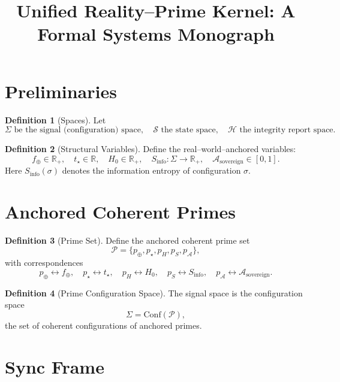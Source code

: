 \documentclass[12pt]{article}
\title{Unified Reality--Prime Kernel: A Formal Systems Monograph}
\author{}
\date{}
\theoremstyle{definition}
\newtheorem{definition}{Definition}[section]
\theoremstyle{plain}
\begin{document}
\maketitle

\tableofcontents

\section{Preliminaries}

\begin{definition}[Spaces]
Let
\[
\Sigma \text{ be the signal (configuration) space}, \quad
\mathcal{S} \text{ the state space}, \quad
\mathcal{H} \text{ the integrity report space}.
\]
\end{definition}

\begin{definition}[Structural Variables]
Define the real--world--anchored variables:
\[
f_{\oplus} \in \mathbb{R}_{+}, \quad
t_{\star} \in \mathbb{R}, \quad
H_0 \in \mathbb{R}_{+}, \quad
S_{\mathrm{info}} : \Sigma \to \mathbb{R}_{+}, \quad
\mathcal{A}_{\mathrm{sovereign}} \in [0,1].
\]
Here \(S_{\mathrm{info}}(\sigma)\) denotes the information entropy of configuration \(\sigma\).
\end{definition}

\section{Anchored Coherent Primes}

\begin{definition}[Prime Set]
Define the anchored coherent prime set
\[
\mathcal{P} = \{p_{\oplus}, p_{\star}, p_{H}, p_{S}, p_{\mathcal{A}}\},
\]
with correspondences
\[
p_{\oplus} \leftrightarrow f_{\oplus}, \quad
p_{\star} \leftrightarrow t_{\star}, \quad
p_{H} \leftrightarrow H_0, \quad
p_{S} \leftrightarrow S_{\mathrm{info}}, \quad
p_{\mathcal{A}} \leftrightarrow \mathcal{A}_{\mathrm{sovereign}}.
\]
\end{definition}

\begin{definition}[Prime Configuration Space]
The signal space is the configuration space
\[
\Sigma = \mathrm{Conf}(\mathcal{P}),
\]
the set of coherent configurations of anchored primes.
\end{definition}

\section{Sync Frame}
\end{document}
